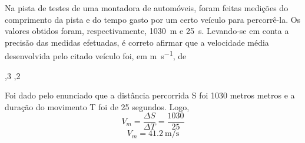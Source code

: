 \question [20] Na pista de testes de uma montadora de automóveis, foram feitas medições do comprimento da pista e do tempo gasto por um certo veículo para percorrê-la. Os valores obtidos foram, respectivamente, \SI{1030}{\meter} e \SI{25}{\second}. Levando-se em conta a precisão das medidas efetuadas, é correto afirmar que a velocidade média desenvolvida pelo citado veículo foi, em \si[per-mode=fraction]{\meter\per\second}, de  


		\begin{EnvUplevel}
			\begin{choices}
			
			,3  
			,2       
				
			\end{choices}
		\end{EnvUplevel}
		
		\begin{EnvUplevel}
		\begin{solution}
		Foi dado pelo enunciado que a distância percorrida \Delta S foi 1030 metros  metros e a duração do movimento  \Delta T foi de 25 segundos. Logo,
		$$
		V_m=\frac{\Delta S}{\Delta T}=\frac{1030}{25}
		$$$$
		V_m=\SI[per-mode=fraction]{41,2}{\meter\per\second}
		$$
		\end{solution}
		\end{EnvUplevel}


	
